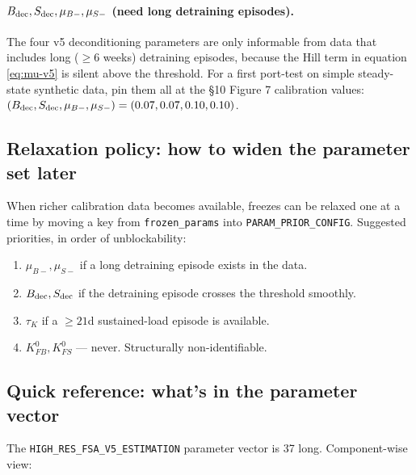 \documentclass[11pt,a4paper]{article}
\theoremstyle{definition}
\begin{document}
\paragraph{$B_{\rm dec}, S_{\rm dec}, \mu_{B-}, \mu_{S-}$ (need long detraining episodes).}
The four v5 deconditioning parameters are only informable from data
that includes long ($\ge 6$ weeks) detraining episodes, because the
Hill term in equation \eqref{eq:mu-v5} is silent above the threshold.
For a first port-test on simple steady-state synthetic data, pin them
all at the §10 Figure 7 calibration values:
$(B_{\rm dec}, S_{\rm dec}, \mu_{B-}, \mu_{S-}) = (0.07, 0.07, 0.10, 0.10)$.

\subsection{Relaxation policy: how to widen the parameter set later}

When richer calibration data becomes available, freezes can be relaxed
one at a time by moving a key from \texttt{frozen\_params} into
\texttt{PARAM\_PRIOR\_CONFIG}. Suggested priorities, in order of
unblockability:

\begin{enumerate}
  \item $\mu_{B-}, \mu_{S-}$ if a long detraining episode exists in the data.
  \item $B_{\rm dec}, S_{\rm dec}$ if the detraining episode crosses the threshold smoothly.
  \item $\tau_K$ if a $\ge 21$d sustained-load episode is available.
  \item $K_{FB}^0, K_{FS}^0$ --- never. Structurally non-identifiable.
\end{enumerate}

\subsection{Quick reference: what's in the parameter vector}

The \texttt{HIGH\_RES\_FSA\_V5\_ESTIMATION} parameter vector is 37 long.
Component-wise view:
\end{document}
